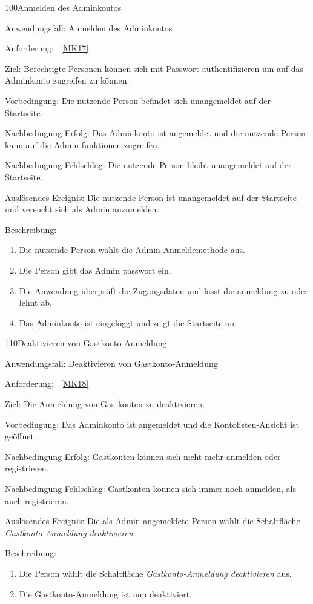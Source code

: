 \begin{function}{100}{Anmelden des Adminkontos}
    \item[Anwendungsfall:] Anmelden des Adminkontos
    \item[Anforderung:]~\ref{MK17}
    \item[Ziel:] Berechtigte Personen können sich mit Passwort authentifizieren um auf das Adminkonto zugreifen zu können.
    \item[Vorbedingung:] Die nutzende Person befindet sich unangemeldet auf der Startseite.
    \item[Nachbedingung Erfolg:] Das Adminkonto ist angemeldet und die nutzende Person kann auf die Admin funktionen zugreifen.
    \item[Nachbedingung Fehlschlag:] Die nutzende Person bleibt unangemeldet auf der Startseite.
    \item[Auslösendes Ereignis:] Die nutzende Person ist unangemeldet auf der Startseite und versucht sich als Admin anzumelden.
    \item[Beschreibung:] ~
    \begin{enumerate}
        \item Die nutzende Person wählt die Admin-Anmeldemethode aus.
        \item Die Person gibt das Admin passwort ein.
        \item Die Anwendung überprüft die Zugangsdaten und lässt die anmeldung zu oder lehnt ab.
        \item Das Adminkonto ist eingeloggt und zeigt die Startseite an.
    \end{enumerate}
\end{function}

\pagebreak

\begin{function}{110}{Deaktivieren von Gastkonto-Anmeldung}
    \item[Anwendungsfall:] Deaktivieren von Gastkonto-Anmeldung
    \item[Anforderung:]~\ref{MK18}
    \item[Ziel:] Die Anmeldung von Gastkonten zu deaktivieren.
    \item[Vorbedingung:] Das Adminkonto ist angemeldet und die Kontolisten-Ansicht ist geöffnet.
    \item[Nachbedingung Erfolg:] Gastkonten können sich nicht mehr anmelden oder registrieren.
    \item[Nachbedingung Fehlschlag:] Gastkonten können sich immer noch anmelden, als auch registrieren.
    \item[Auslösendes Ereignis:] Die als Admin angemeldete Person wählt die Schaltfläche \textit{Gastkonto-Anmeldung deaktivieren}.
    \item[Beschreibung:] ~
    \begin{enumerate}
        \item Die Person wählt die Schaltfläche \textit{Gastkonto-Anmeldung deaktivieren} aus.
        \item Die Gastkonto-Anmeldung ist nun deaktiviert.
    \end{enumerate}
\end{function}

